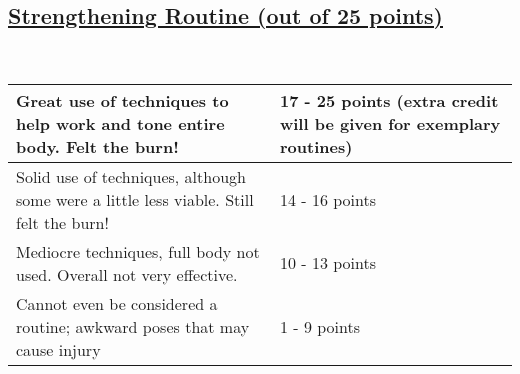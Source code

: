 \documentclass{article}
\begin{document}
\subsection*{\underline{Strengthening Routine (out of 25 points)}}
\\
\begin{center}
\begin{tabular}{ | m{6cm} | m{6cm} | } 
\hline
\vspace{.2cm}Great use of techniques to help work and tone entire body. Felt the burn!\vspace{.2cm} & \vspace{.2cm}17 - 25 points (extra credit will be given for exemplary routines) \vspace{.2cm}  \\ 
\hline
\vspace{.2cm}Solid use of techniques, although some were a little less viable. Still felt the burn!\vspace{.2cm} &\vspace{.2cm} 14 - 16 points \vspace{.2cm} \\ 
\hline
\vspace{.2cm}Mediocre techniques, full body not used. Overall not very effective.\vspace{.2cm} &\vspace{.2cm} 10 - 13 points\vspace{.2cm}  \\ 
\hline
\vspace{.2cm}Cannot even be considered a routine; awkward poses that may cause injury \vspace{.2cm}&\vspace{.2cm} 1 - 9 points \vspace{.2cm} \\ 
\hline
\end{tabular}
\end{center}
\end{document}
